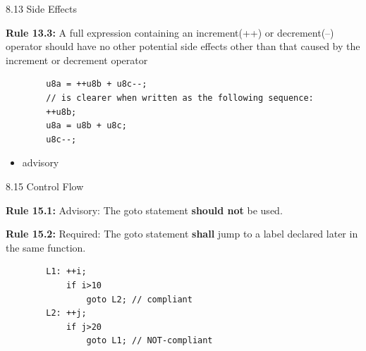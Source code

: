 \documentclass[t]{beamer} %
\begin{document}

\begin{frame}[fragile]{8.13 Side Effects}
\begin{block}{\textbf{Rule 13.3:} A full expression containing an increment(++) or decrement(--) operator should have no other potential side effects other than that caused by the increment or decrement operator}
    \begin{lstlisting}
        u8a = ++u8b + u8c--;
        // is clearer when written as the following sequence:
        ++u8b;
        u8a = u8b + u8c;
        u8c--;
    \end{lstlisting}
     \begin{itemize}
        \item advisory
    \end{itemize}
\end{block}{}
\begin{block}
 
\end{block}{}

\end{frame}




\begin{frame}[fragile]{8.15 Control Flow}
\begin{block}{\textbf{Rule 15.1:} Advisory: The goto statement \textbf{should not} be used.}
\end{block}{}
\begin{block}{\textbf{Rule 15.2:} Required: The goto statement \textbf{shall} jump to a label declared later in the same function.}
\end{block}{}

     \begin{lstlisting}
        L1: ++i;
            if i>10
                goto L2; // compliant
        L2: ++j;
            if j>20
                goto L1; // NOT-compliant
    \end{lstlisting}
 
\end{frame}
\end{document}
